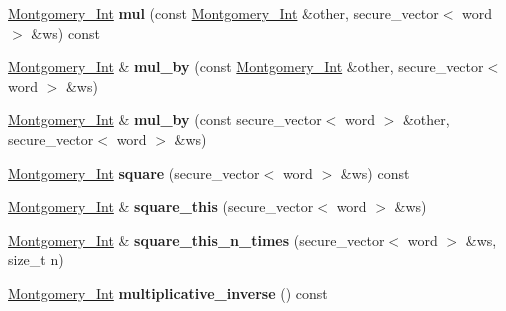\begin{DoxyCompactItemize}
\item 
\mbox{\label{class_botan_1_1_montgomery___int_af6d0103096d488d5b9a9bb02d6dc7c39}} 
\mbox{\hyperlink{class_botan_1_1_montgomery___int}{Montgomery\+\_\+\+Int}} {\bfseries mul} (const \mbox{\hyperlink{class_botan_1_1_montgomery___int}{Montgomery\+\_\+\+Int}} \&other, secure\+\_\+vector$<$ word $>$ \&ws) const
\item 
\mbox{\label{class_botan_1_1_montgomery___int_af8071f3f36f552cc2cded161e26cd354}} 
\mbox{\hyperlink{class_botan_1_1_montgomery___int}{Montgomery\+\_\+\+Int}} \& {\bfseries mul\+\_\+by} (const \mbox{\hyperlink{class_botan_1_1_montgomery___int}{Montgomery\+\_\+\+Int}} \&other, secure\+\_\+vector$<$ word $>$ \&ws)
\item 
\mbox{\label{class_botan_1_1_montgomery___int_a41e398fb40309a24fa00f01de0bbcf31}} 
\mbox{\hyperlink{class_botan_1_1_montgomery___int}{Montgomery\+\_\+\+Int}} \& {\bfseries mul\+\_\+by} (const secure\+\_\+vector$<$ word $>$ \&other, secure\+\_\+vector$<$ word $>$ \&ws)
\item 
\mbox{\label{class_botan_1_1_montgomery___int_a4dacf7853057df8db087d5eb096a7cc4}} 
\mbox{\hyperlink{class_botan_1_1_montgomery___int}{Montgomery\+\_\+\+Int}} {\bfseries square} (secure\+\_\+vector$<$ word $>$ \&ws) const
\item 
\mbox{\label{class_botan_1_1_montgomery___int_adeff8ccd15a6c9af59a0e19f65a6959d}} 
\mbox{\hyperlink{class_botan_1_1_montgomery___int}{Montgomery\+\_\+\+Int}} \& {\bfseries square\+\_\+this} (secure\+\_\+vector$<$ word $>$ \&ws)
\item 
\mbox{\label{class_botan_1_1_montgomery___int_ac2a879516ae2be8f2a4f7d4692903424}} 
\mbox{\hyperlink{class_botan_1_1_montgomery___int}{Montgomery\+\_\+\+Int}} \& {\bfseries square\+\_\+this\+\_\+n\+\_\+times} (secure\+\_\+vector$<$ word $>$ \&ws, size\+\_\+t n)
\item 
\mbox{\label{class_botan_1_1_montgomery___int_ae65f3e4ec57b3d80d9e8885cb825ab92}} 
\mbox{\hyperlink{class_botan_1_1_montgomery___int}{Montgomery\+\_\+\+Int}} {\bfseries multiplicative\+\_\+inverse} () const

\end{DoxyCompactItemize}

